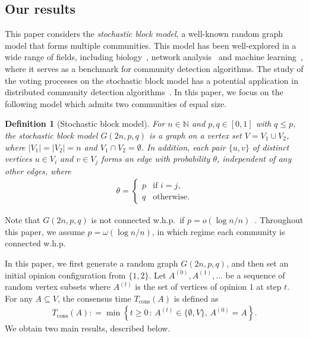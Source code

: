 \documentclass[letterpaper,11pt]{article}
\newtheorem{definition}[theorem]{Definition}
\newcommand{\Tcons}{T_{\mathrm{cons}}}
\def\defeq{\mathrel{\mathop:}=}%
\begin{document}
\subsection{Our results}
This paper considers the \emph{stochastic block model}, a well-known random graph model that forms multiple communities.
This model has been well-explored in a wide range of fields, including biology~\cite{CY06, MPNRYE99}, network analysis~\cite{BDLB17,GZFA10} and machine learning~\cite{AS15,Abbe18}, where it serves as a benchmark for community detection algorithms.
The study of the voting processes on the stochastic block model has a potential application in distributed community detection algorithms~\cite{BCMNPRT18,BCNPT17,CNS19}.
In this paper, we focus on the following model which admits two communities of equal size.
\begin{definition}[Stochastic block model]
\label{def:SBM}
For $n\in\mathbb{N}$ and $p,q\in[0,1]$ with $q\leq p$, the stochastic block model $G(2n,p,q)$ is a graph on a vertex set $V=V_1\cup V_2$, where $|V_1|=|V_2|=n$ and $V_1\cap V_2=\emptyset$.
In addition, each pair $\{u,v\}$ of distinct vertices $u\in V_i$ and $v\in V_j$ forms an edge with probability $\theta$, independent of any other edges, where
\begin{align*}
\theta = \begin{cases}
p & \text{if $i=j$},\\
q & \text{otherwise}.
\end{cases}
\end{align*}
\end{definition}
%
Note that $G(2n,p,q)$ is not connected w.h.p.~if $p=o(\log n/n)$~\cite{FK16}.
Throughout this paper, we assume $p=\omega(\log n/n)$, in which regime each community is connected w.h.p.

In this paper, we first generate a random graph $G(2n,p,q)$, 
and then set an initial opinion configuration from $\{1,2\}$.
Let $A^{(0)}, A^{(1)}, \ldots$ be a sequence of random vertex subsets where $A^{(t)}$ is the set of vertices of opinion $1$ at step $t$.
For any $A\subseteq V$, the consensus time $\Tcons(A)$ is defined as
\begin{align*}
\Tcons(A)\defeq \min\left\{t\geq 0\,:\,A^{(t)}\in\{\emptyset,V\},\,A^{(0)}=A\right\}.
\end{align*}
We obtain two main results, described below.
%
\end{document}
